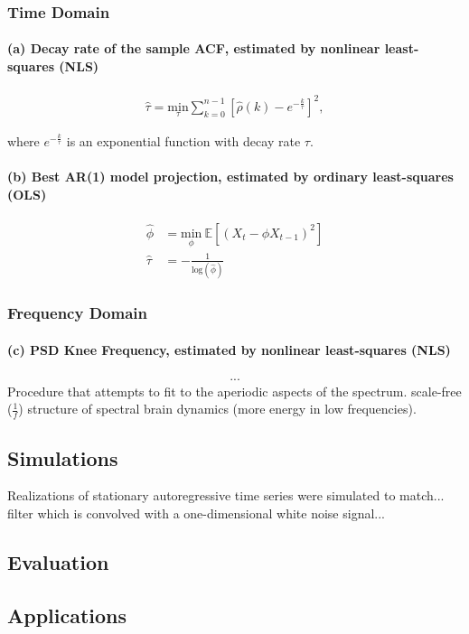\documentclass[main.tex]{subfiles}
\begin{document}
\subsubsection*{Time Domain}
\paragraph{(a) Decay rate of the sample ACF, estimated by nonlinear least-squares (NLS)}
\begin{align*}
    \hat \tau = \underset{{\tau}}{\text{min}} \sum_{k=0}^{n-1}[\hat \rho(k) - e^{-\frac{k}{\tau}}]^2,
\end{align*}

where $e^{-\frac{k}{\tau}}$ is an exponential function with decay rate $\tau$. 

\paragraph{(b) Best AR(1) model projection, estimated by ordinary least-squares (OLS)}
\begin{align*}
    \hat \phi &= \underset{\phi}{\text{min}} \ \mathbb{E}[(X_t - \phi X_{t-1})^2]\\
    \hat \tau &= -\frac{1}{\text{log}(\hat \phi)}
\end{align*}

\subsubsection*{Frequency Domain}
\paragraph{(c) PSD Knee Frequency, estimated by nonlinear least-squares (NLS)}
\begin{align*}
    ...
\end{align*}
Procedure that attempts to fit to the aperiodic aspects of the spectrum. scale-free ($\frac{1}{f}$) structure of spectral brain dynamics (more energy in low frequencies).

\subsection{Simulations}  
Realizations of stationary autoregressive time series were simulated to match...\\
filter which is convolved with a one-dimensional white noise signal...

\subsection{Evaluation}

\subsection{Applications}
\end{document}
